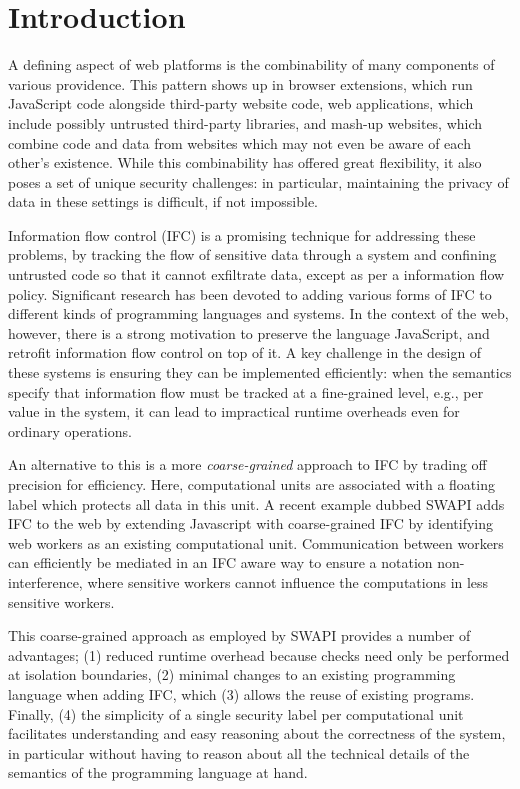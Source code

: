 \section{Introduction}
\label{sec:intro}

A defining aspect of web platforms is the combinability of many
components of various providence.  This pattern shows up in browser
extensions, which run JavaScript code alongside third-party website
code, web applications, which include possibly untrusted third-party
libraries, and mash-up websites, which combine code and data from
websites which may not even be aware of each other's existence.  While
this combinability has offered great flexibility, it also poses a set of
unique security challenges: in particular, maintaining the privacy of
data in these settings is difficult, if not impossible.

Information flow control (IFC) is a promising technique for addressing these
problems, by tracking the flow of sensitive data through a system and
confining untrusted code so that it cannot exfiltrate data, except as
per a information flow policy.  Significant research has been devoted to
adding various forms of IFC to different kinds of programming languages
and systems.  In the context of the web, however, there is a strong
motivation to preserve the language JavaScript, and retrofit information
flow control on top of it.  A key challenge in the design of these
systems is ensuring they can be implemented efficiently: when the
semantics specify that information flow must be tracked at a
fine-grained level, e.g., per value in the system,  it can lead to
impractical runtime overheads even for ordinary operations.

An alternative to this is a more \textit{coarse-grained} approach
to IFC by trading off precision for efficiency.  Here, computational
units are associated with a floating label which protects all data
in this unit.
A recent example dubbed SWAPI adds IFC to the web by extending
Javascript with coarse-grained IFC by identifying web workers as
an existing computational unit.  Communication between workers can
efficiently be mediated in an IFC aware way to ensure a notation
non-interference, where sensitive workers cannot influence the
computations in less sensitive workers.

This coarse-grained approach as employed by SWAPI provides a number
of advantages; (1) reduced runtime overhead because checks need only
be performed at isolation boundaries, (2) minimal changes to an
existing programming language when adding IFC, which (3) allows
the reuse of existing programs.  Finally, (4) the simplicity
of a single security label per computational unit facilitates
understanding and easy reasoning about the correctness of the
system, in particular without having to reason about all the
technical details of the semantics of the programming language
at hand.

